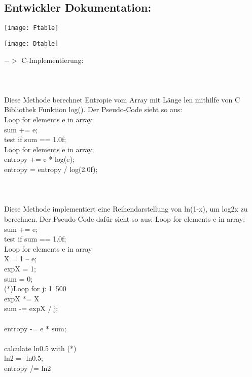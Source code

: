 \documentclass[11pt]{article}
\begin{document}
\subsection{Entwickler Dokumentation:}
\centerline{\texttt{[image: Ftable]}}
\centerline{\texttt{[image: Dtable]}}


{\Large $->$  C-Implementierung:}\\\\
{\color{red}{\Large float calc\_entropy\_c1(float *data, unsigned int len):}}\\\\
Diese Methode berechnet Entropie vom Array mit L\"ange len mithilfe von C Bibliothek Funktion log(). Der Pseudo-Code sieht so aus:\\
Loop for elements e in array:\\
	sum += e;\\
test if sum == 1.0f;\\
Loop for elements e in array;\\
	entropy += e * log(e);\\
entropy = entropy / log(2.0f);\\\\
{\color{red}{\Large float calc\_entropy\_c2(float *data, unsigned int len):} }\\\\
Diese Methode implementiert eine Reihendarstellung von ln(1-x), um log2x zu berechnen. Der Pseudo-Code daf\"ur sieht so aus:
Loop for elements e in array:\\
	sum += e; \\
test if sum == 1.0f;\\
Loop for elements e in array {	\\	
X = 1 – e;\\
expX = 1;\\
sum = 0;\\
(*)Loop for j: 1~500{\\
	expX *= X\\
	sum -= expX / j;\\
}\\
entropy -= e * sum;\\
}\\
calculate ln0.5 with (*)\\
ln2 = -ln0.5;\\
entropy /= ln2\\\\
{\color{red}{\Large float* CreateProbabilityArray()}}\\
\end{document}
